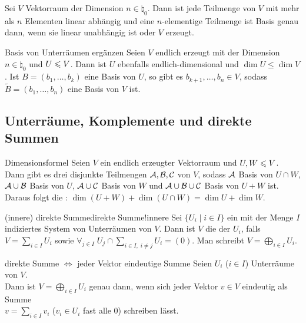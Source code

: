 \begin{Kor}
    Sei $V$ Vektorraum der Dimension $n \in \natural_0$.
    Dann ist jede Teilmenge von $V$ mit mehr als $n$ Elementen linear
    abhängig und eine $n$-elementige Teilmenge ist Basis genau dann,
    wenn sie linear unabhängig ist oder $V$ erzeugt.
\end{Kor}

\begin{Satz}{Basis von Unterräumen ergänzen}
    Seien $V$ endlich erzeugt mit der Dimension $n \in \natural_0$ und
    $U \leqslant V$.
    Dann ist $U$ ebenfalls endlich-dimensional und $\dim U \le \dim V$.
    Ist $B = (b_1, \ldots, b_k)$ eine Basis von $U$, so gibt es
    $b_{k+1}, \ldots, b_n \in V$, sodass $\tilde{B} = (b_1, \ldots, b_n)$
    eine Basis von $V$ ist.
\end{Satz}

\subsection{%
    Unterräume, Komplemente und direkte Summen%
}

\begin{Satz}{Dimensionsformel}
    Seien $V$ ein endlich erzeugter Vektorraum und $U, W \leqslant V$. \\
    Dann gibt es drei disjunkte Teilmengen
    $\mathcal{A}, \mathcal{B}, \mathcal{C}$ von $V$, sodass
    $\mathcal{A}$ Basis von $U \cap W$,
    $\mathcal{A} \cup \mathcal{B}$ Basis von $U$,
    $\mathcal{A} \cup \mathcal{C}$ Basis von $W$ und
    $\mathcal{A} \cup \mathcal{B} \cup \mathcal{C}$ Basis von $U + W$ ist. \\
    Daraus folgt die :
    $\dim(U + W) + \dim(U \cap W) = \dim U + \dim W$.
\end{Satz}

\begin{xDef}{(innere) direkte Summe}{direkte Summe!innere}
    Sei $\{U_i \;|\; i \in I\}$ ein mit der Menge $I$ indiziertes System von
    Unterräumen von $V$.
    Dann ist $V$ die
     der
    $U_i$, falls $V = \sum_{i \in I} U_i$ sowie
    $\forall_{j \in I}\; U_j \cap \sum_{i \in I,\; i \not= j} U_i = (0)$.
    Man schreibt $V = \bigoplus_{i \in I} U_i$.
\end{xDef}

\begin{Satz}{direkte Summe $\Leftrightarrow$ jeder Vektor eindeutige Summe}
    Seien $U_i$ ($i \in I$) Unterräume von $V$. \\
    Dann ist $V = \bigoplus_{i \in I} U_i$
    genau dann, wenn sich jeder Vektor $v \in V$ eindeutig als Summe \\
    $v = \sum_{i \in I} v_i$
    ($v_i \in U_i$ fast alle $0$) schreiben lässt.
\end{Satz}


